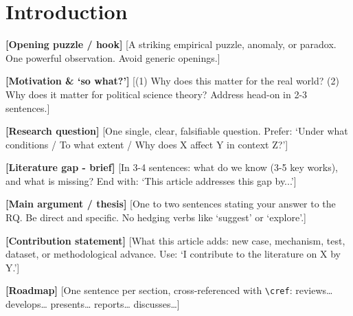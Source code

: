 
\begin{abstract}
[1-2 sentences: Empirical puzzle/hook]
[1-2 sentences: Motivation/importance]
[1 sentence: Research question]
[1-2 sentences: Research design/approach]
[1-2 sentences: Main findings]
[1 sentence: Contribution/implications]

\medskip
\noindent\textbf{Keywords:} [Keyword 1], [Keyword 2], [Keyword 3], [Keyword 4], [Keyword 5]
\end{abstract}

\newpage

\section{Introduction}\label{sec:intro} %

\textbf{[Opening puzzle / hook]} %
[A striking empirical puzzle, anomaly, or paradox. One powerful observation. Avoid generic openings.]

\textbf{[Motivation \& `so what?']} %
[(1) Why does this matter for the real world? (2) Why does it matter for political science theory? Address head-on in 2-3 sentences.]

\textbf{[Research question]} %
[One single, clear, falsifiable question. Prefer: `Under what conditions / To what extent / Why does X affect Y in context Z?']

\textbf{[Literature gap - brief]} %
[In 3-4 sentences: what do we know (3-5 key works), and what is missing? End with: `This article addresses this gap by...']

\textbf{[Main argument / thesis]} %
[One to two sentences stating your answer to the RQ. Be direct and specific. No hedging verbs like `suggest' or `explore'.]

\textbf{[Contribution statement]} %
[What this article adds: new case, mechanism, test, dataset, or methodological advance. Use: `I contribute to the literature on X by Y.']

\textbf{[Roadmap]} %
[One sentence per section, cross-referenced with \texttt{\textbackslash cref}: reviews\dots{}  develops\dots{}  presents\dots{}  reports\dots{}  discusses\dots]

